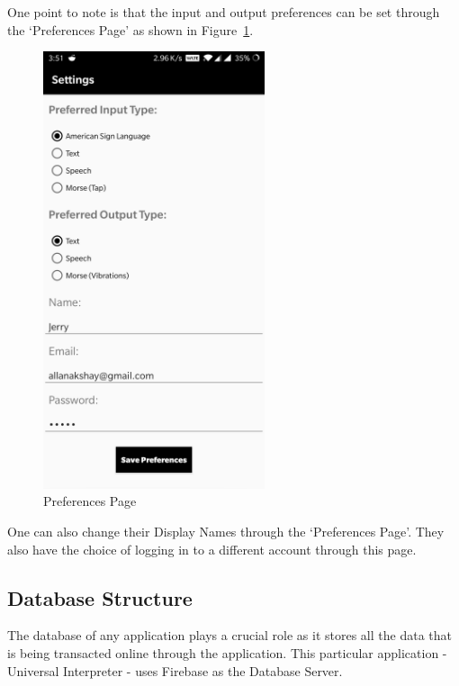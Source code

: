 \documentclass[14pt]{report}
\begin{document}
					One point to note is that the input and output preferences can be set through the `Preferences Page' as shown in Figure~\ref{fig:PrefPage}.\\
					\begin{figure}[h]
						\includegraphics[width=6.5cm]{PrefPage.jpeg}
						\centering
						\caption{Preferences Page}
						\label{fig:PrefPage}
					\end{figure} 

					One can also change their Display Names through the `Preferences Page'. They also have the choice of logging in to a different account through this page.
			\subsection{Database Structure}
				The database of any application plays a crucial role as it stores all the data that is being transacted online through the application. This particular application - Universal Interpreter - uses Firebase as the Database Server.\\
\end{document}
